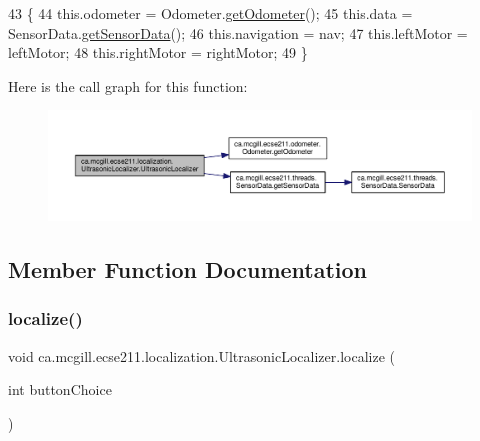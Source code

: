 \begin{DoxyCode}
43                                                                    \{
44     this.odometer = Odometer.\hyperlink{classca_1_1mcgill_1_1ecse211_1_1odometer_1_1_odometer_a99171f11e34dea918fa9dd069d721439}{getOdometer}();
45     this.data = SensorData.\hyperlink{classca_1_1mcgill_1_1ecse211_1_1threads_1_1_sensor_data_a8260aba53b4474ca1275e4ce26157977}{getSensorData}();
46     this.navigation = nav;
47     this.leftMotor = leftMotor;
48     this.rightMotor = rightMotor;
49   \}
\end{DoxyCode}
Here is the call graph for this function\+:\nopagebreak
\begin{figure}[H]
\begin{center}
\leavevmode
\includegraphics[width=350pt]{classca_1_1mcgill_1_1ecse211_1_1localization_1_1_ultrasonic_localizer_a3603202cdb5035c4e4164933b0aebeec_cgraph}
\end{center}
\end{figure}


\subsection{Member Function Documentation}
\mbox{\label{classca_1_1mcgill_1_1ecse211_1_1localization_1_1_ultrasonic_localizer_ab78196997d7409aec0c35603686989ad}} 
\subsubsection{\texorpdfstring{localize()}{localize()}}
{\footnotesize\ttfamily void ca.\+mcgill.\+ecse211.\+localization.\+Ultrasonic\+Localizer.\+localize (\begin{DoxyParamCaption}\item[{int}]{button\+Choice }\end{DoxyParamCaption})}

